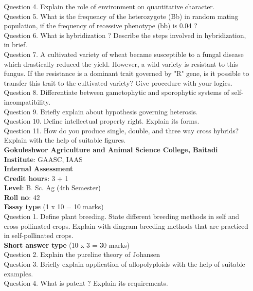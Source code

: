 \documentclass[12pt]{article}\usepackage[]{graphicx}\usepackage[]{color}
\begin{document}
Question 4. Explain the role of environment on quantitative character.\\
Question 5. What is the frequency of the heterozygote (Bb) in random mating population, if the frequency of recessive phenotype (bb) is 0.04 ?\\
Question 6. What is hybridization ? Describe the steps involved in hybridization, in brief.\\
Question 7. A cultivated variety of wheat became susceptible to a fungal disease which drastically reduced the yield. However, a wild variety is resistant to this fungus. If the resistance is a dominant trait governed by "R" gene, is it possible to transfer this trait to the cultivated variety? Give procedure with your logics.\\
Question 8. Differentiate between gametophytic and sporophytic systems of self-incompatibility.\\
Question 9. Briefly explain about hypothesis governing heterosis.\\
Question 10. Define intellectual property right. Explain its forms.\\
Question 11. How do you produce single, double, and three way cross hybrids? Explain with the help of suitable figures.\\
\clearpage 
{\centering \Large{\textbf{Gokuleshwor Agriculture and Animal Science College, Baitadi}} \\[0.25cm]
            \textbf{Institute}: GAASC, IAAS \\[0.2cm]
            \textbf{Internal Assessment} \\[0.2cm]} 
\textbf{Credit hours}: 3 + 1 \\ 
\textbf{Level}: B. Sc. Ag (4th Semester) \\
\textbf{Roll no}: 42 \\[0.5cm] 
\textbf{Essay type} (1 x 10 = 10 marks) \\
Question 1. Define plant breeding. State different breeding methods in self and cross pollinated crops. Explain with diagram breeding methods that are practiced in self-pollinated crops.\\
\textbf{Short answer type} (10 x 3 = 30 marks) \\
Question 2. Explain the pureline theory of Johansen\\
Question 3. Briefly explain application of allopolyploids with the help of suitable examples.\\
Question 4. What is patent ? Explain its requirements.\\
\end{document}
